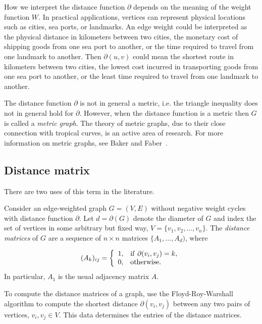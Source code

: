 How we interpret the distance function $\partial$ depends on the
meaning of the weight function $W$. In practical applications,
vertices can represent physical locations such as cities, sea ports,
or landmarks. An edge weight could be interpreted as the physical
distance in kilometers between two cities, the monetary cost of
shipping goods from one sea port to another, or the time required to
travel from one landmark to another. Then $\partial(u,v)$ could mean
the shortest route in kilometers between two cities, the lowest cost
incurred in transporting goods from one sea port to another, or the
least time required to travel from one landmark to another.

The distance function $\partial$ is not in
general a metric, i.e. the triangle
inequality does not in general hold for
$\partial$. However, when the distance function is a metric then $G$
is called a \emph{metric graph}. The theory of
metric graphs, due to their close connection with
tropical curves, is an active area of research. For more information
on metric graphs, see Baker and
Faber~\cite{BakerFaber2006}.



\subsection{Distance matrix}

There are two uses of this term in the literature.

Consider an edge-weighted graph $G=(V,E)$ without negative weight
cycles with distance function $\partial$. Let $d=\partial(G)$
denote the diameter of $G$ and index the
set of vertices in some arbitrary but fixed way,
$V=\{v_1,v_2,\dots, v_n\}$.
The {\it distance matrices} of $G$ are a sequence of $n\times n$ matrices
$\{A_1,\dots, A_d)$, where

\[
(A_k)_{ij} =
\left\{
\begin{array}{ll}
1,& {\rm if}\ \partial(v_i,v_j)=k,\\
0,& {\rm otherwise}.
\end{array}
\right.
\]
In particular, $A_1$ is the usual adjacency matrix $A$.

To compute the distance matrices of a graph, use the Floyd-Roy-Warshall
algorithm to compute the shortest distance
$\partial(v_i,v_j)$ between any two pairs of vertices,
$v_i,v_j\in V$. This data determines the entries of
the distance matrices.


